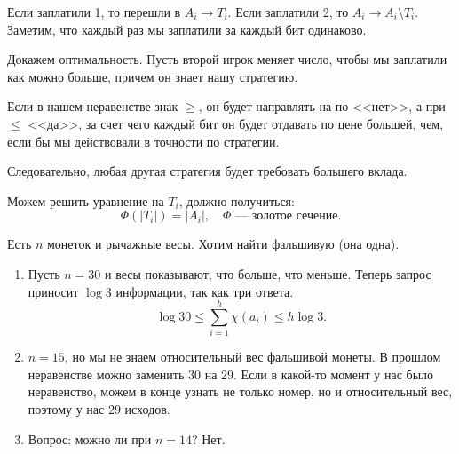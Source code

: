 Если заплатили 1, то перешли в  $ A_i \to T_i$. Если заплатили 2, то $ A_i \to A_{i} \setminus T_i$. Заметим, что каждый раз мы заплатили за каждый бит одинаково.

Докажем оптимальность. Пусть второй игрок меняет число, чтобы мы заплатили как можно больше, причем он знает нашу стратегию.

Если в нашем неравенстве знак $ \ge $, он будет направлять на по <<нет>>, а при  $ \le$ <<да>>, за счет чего каждый бит он будет отдавать по цене большей, чем, если бы мы действовали в точности по стратегии. 

Следовательно, любая другая стратегия будет требовать большего вклада.

Можем решить уравнение на $ T_i$, должно получиться:
 \[
	 \Phi(\lvert T_i \rvert ) = \lvert A_i \rvert, \quad \Phi \text{ --- золотое сечение} 
.\] 

\begin{prac}
	Есть $ n$ монеток и рычажные весы. Хотим найти фальшивую (она одна). 
\begin{enumerate}
    \item Пусть $ n = 30$ и весы показывают, что больше, что меньше. Теперь запрос приносит $  \log 3$ информации, так как три ответа.
		\[
			\log 30 \le  \sum_{i=1}^{h} \chi(a_i) \le h \log 3 
		.\] 
	\item $ n = 15$, но мы не знаем относительный вес фальшивой монеты. В прошлом неравенстве можно заменить  $ 30$ на $ 29$. Если в какой-то момент у нас было неравенство, можем в конце узнать не только номер, но и относительный вес, поэтому у нас $ 29$ исходов.
	\item Вопрос: можно ли при $ n=14$?  Нет. 
\end{enumerate} 
\end{prac}
